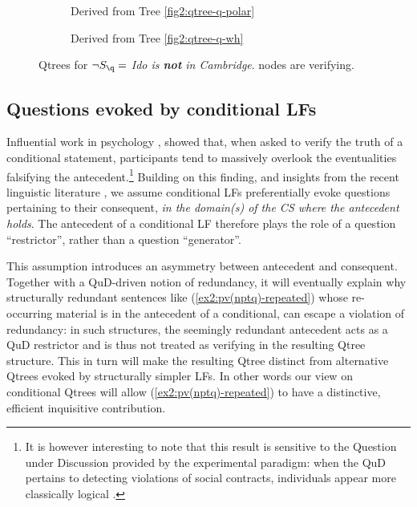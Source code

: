 	\begin{figure}[H]
		\centering
		\begin{subfigure}[b]{.3\linewidth}
			\centering
			\caption{Derived from Tree \ref{fig2:qtree-q-polar}}\label{fig2:qtree-nq-polar}
		\end{subfigure}\qquad
		\begin{subfigure}[b]{.3\linewidth}
			\centering
			\scalebox{1}{
				\begin{forest}
					[CS [\fbox{$\p$}][{$\q$}][\fbox{$\r$}][\fbox{...}]]
				\end{forest}
			}
			\caption{Derived from Tree \ref{fig2:qtree-q-wh}}\label{fig2:qtree-nq-wh}
		\end{subfigure}
		\caption{Qtrees for $\neg S\protect_{\q}=$ \textit{Ido is \textbf{not} in Cambridge}. \setlength{\fboxsep}{1pt} nodes are verifying.}
		\label{fig2:qtrees-nq}
	\end{figure}





\subsection{Questions evoked by conditional LFs}
Influential work in psychology \citep{Wason1968}, showed that, when asked to verify the truth of a conditional statement, participants tend to massively overlook the eventualities falsifying the antecedent.\footnote{It is however interesting to note that this result is sensitive to the Question under Discussion provided by the experimental paradigm: when the QuD pertains to detecting violations of social contracts, individuals appear more classically logical \cite{Cosmides1989}.} Building on this finding, and insights from the recent linguistic literature \citep{Aloni2022}, we assume conditional LFs preferentially evoke questions pertaining to their consequent, \textit{in the domain(s) of the CS where the antecedent holds}. The antecedent of a conditional LF therefore plays the role of a question ``restrictor'', rather than a question ``generator''.

This assumption introduces an asymmetry between antecedent and consequent. Together with a QuD-driven notion of redundancy, it will eventually explain why structurally redundant sentences like (\ref{ex2:pv(nptq)-repeated}) whose re-occurring material is in the antecedent of a conditional, can escape a violation of redundancy: in such structures, the seemingly redundant antecedent acts as a QuD restrictor and is thus not treated as verifying in the resulting Qtree structure. This in turn will make the resulting Qtree distinct from alternative Qtrees evoked by structurally simpler LFs. In other words our view on conditional Qtrees will allow (\ref{ex2:pv(nptq)-repeated}) to have a distinctive, efficient inquisitive contribution.

